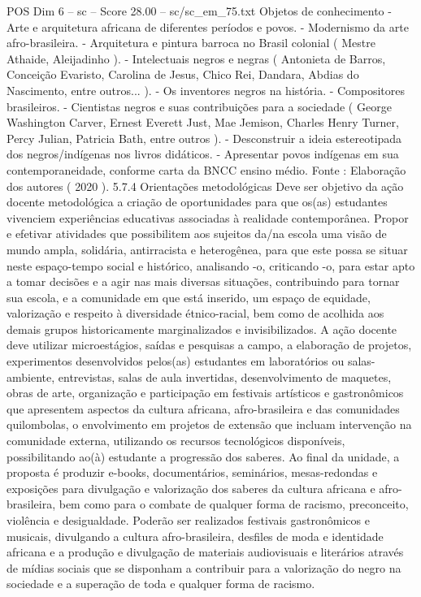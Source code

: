 \begin{textsample}{POS Dim 6 – sc – Score 28.00 – sc/sc\_em\_75.txt}
Objetos de conhecimento - Arte e arquitetura africana de diferentes períodos e povos. - Modernismo da arte afro-brasileira. - Arquitetura e pintura barroca no Brasil colonial ( Mestre Athaide, Aleijadinho ). - Intelectuais negros e negras ( Antonieta de Barros, Conceição Evaristo, Carolina de Jesus, Chico Rei, Dandara, Abdias do Nascimento, entre outros... ). - Os inventores negros na história. - Compositores brasileiros. - Cientistas negros e suas contribuições para a sociedade ( George Washington Carver, Ernest Everett Just, Mae Jemison, Charles Henry Turner, Percy Julian, Patricia Bath, entre outros ). - Desconstruir a ideia estereotipada dos negros/indígenas nos livros didáticos. - Apresentar povos indígenas em sua contemporaneidade, conforme carta da BNCC ensino médio.
Fonte : Elaboração dos autores ( 2020 ). 5.7.4 Orientações metodológicas Deve ser objetivo da ação docente metodológica a criação de oportunidades para que os(as) estudantes vivenciem experiências educativas associadas à realidade contemporânea.
Propor e efetivar atividades que possibilitem aos sujeitos da/na escola uma visão de mundo ampla, solidária, antirracista e heterogênea, para que este possa se situar neste espaço-tempo social e histórico, analisando -o, criticando -o, para estar apto a tomar decisões e a agir nas mais diversas situações, contribuindo para tornar sua escola, e a comunidade em que está inserido, um espaço de equidade, valorização e respeito à diversidade étnico-racial, bem como de acolhida aos demais grupos historicamente marginalizados e invisibilizados.
A ação docente deve utilizar microestágios, saídas e pesquisas a campo, a elaboração de projetos, experimentos desenvolvidos pelos(as) estudantes em laboratórios ou salas-ambiente, entrevistas, salas de aula invertidas, desenvolvimento de maquetes, obras de arte, organização e participação em festivais artísticos e gastronômicos que apresentem aspectos da cultura africana, afro-brasileira e das comunidades quilombolas, o envolvimento em projetos de extensão que incluam intervenção na comunidade externa, utilizando os recursos tecnológicos disponíveis, possibilitando ao(à) estudante a progressão dos saberes.
Ao final da unidade, a proposta é produzir e-books, documentários, seminários, mesas-redondas e exposições para divulgação e valorização dos saberes da cultura africana e afro-brasileira, bem como para o combate de qualquer forma de racismo, preconceito, violência e desigualdade.
Poderão ser realizados festivais gastronômicos e musicais, divulgando a cultura afro-brasileira, desfiles de moda e identidade africana e a produção e divulgação de materiais audiovisuais e literários através de mídias sociais que se disponham a contribuir para a valorização do negro na sociedade e a superação de toda e qualquer forma de racismo.

\end{textsample}
